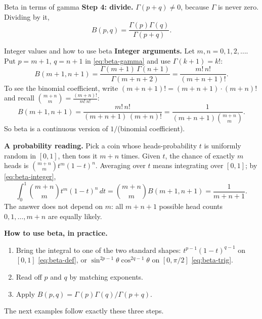 \documentclass[11pt]{beamer}
\begin{document}
\begin{frame}[allowframebreaks=1.00]{Beta in terms of gamma}
\textbf{Step 4: divide.} \(\Gamma(p+q)\neq0\), because \(\Gamma\) is never zero. Dividing by it,
\begin{equation}
  B(p,q)
   =\frac{\Gamma(p)\Gamma(q)}{\Gamma(p+q)}.
  \label{eq:beta-gamma}
\end{equation}
\end{frame}

\begin{frame}[allowframebreaks=1.00]{Integer values and how to use beta}
\footnotesize
\textbf{Integer arguments.} Let \(m,n=0,1,2,\dots\). Put \(p=m+1\), \(q=n+1\) in
\eqref{eq:beta-gamma} and use \(\Gamma(k+1)=k!\):
\[
 B(m+1,n+1)=\frac{\Gamma(m+1)\,\Gamma(n+1)}{\Gamma(m+n+2)}=\frac{m!\,n!}{(m+n+1)!}.
\]
To see the binomial coefficient, write \((m+n+1)!=(m+n+1)\cdot(m+n)!\) and recall
\(\binom{m+n}{m}=\frac{(m+n)!}{m!\,n!}\):
\begin{equation}
 B(m+1,n+1)=\frac{m!\,n!}{(m+n+1)\,(m+n)!}
 =\frac1{(m+n+1)\binom{m+n}{m}}.
 \label{eq:beta-integer}
\end{equation}
So beta is a continuous version of \(1/\)(binomial coefficient).

\textbf{A probability reading.} Pick a coin whose heads-probability \(t\) is uniformly random in
\([0,1]\), then toss it \(m+n\) times. Given \(t\), the chance of exactly \(m\) heads is
\(\binom{m+n}{m}t^m(1-t)^n\). Averaging over \(t\) means integrating over \([0,1]\); by
\eqref{eq:beta-integer},
\[
 \int_0^1\binom{m+n}{m}t^m(1-t)^n\,dt=\binom{m+n}{m}B(m+1,n+1)=\frac1{m+n+1}.
\]
The answer does not depend on \(m\): all \(m+n+1\) possible head counts \(0,1,\dots,m+n\) are equally
likely.
\par\framebreak\par
\textbf{How to use beta, in practice.}
\begin{enumerate}
  \item Bring the integral to one of the two standard shapes:
        \(t^{p-1}(1-t)^{q-1}\) on \([0,1]\) \eqref{eq:beta-def}, or
        \(\sin^{2p-1}\theta\cos^{2q-1}\theta\) on \([0,\pi/2]\) \eqref{eq:beta-trig}.
  \item Read off \(p\) and \(q\) by matching exponents.
  \item Apply \(B(p,q)=\Gamma(p)\Gamma(q)/\Gamma(p+q)\).
\end{enumerate}
The next examples follow exactly these three steps.
\end{frame}
\end{document}
